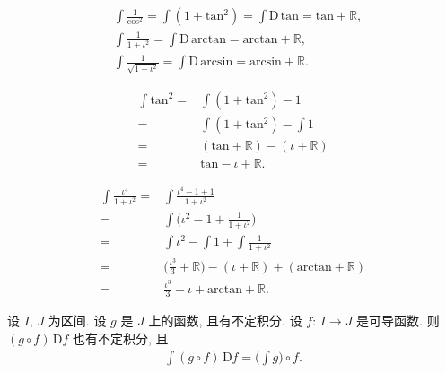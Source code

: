 \begin{example}
    \begin{align*}
         & \int {\frac{1}{\mathrm{cos}^2}} = \int {(1 + \mathrm{tan}^2)} = \int {\mathrm{D}\,\mathrm{tan}} = \mathrm{tan} + \mathbb{R}, \\
         & \int {\frac{1}{1 + \iota^2}} = \int {\mathrm{D}\,\mathrm{arctan}} = \mathrm{arctan} + \mathbb{R},                            \\
         & \int {\frac{1}{\sqrt{1 - \iota^2}}} = \int {\mathrm{D}\,\mathrm{arcsin}} = \mathrm{arcsin} + \mathbb{R}.
    \end{align*}
\end{example}

\begin{example}
    \begin{align*}
        \int {\mathrm{tan}^2}
        = {} & \int {(1 + \mathrm{tan}^2) - 1}                    \\
        = {} & \int {(1 + \mathrm{tan}^2)} - \int {1}             \\
        = {} & (\mathrm{tan} + \mathbb{R}) - (\iota + \mathbb{R}) \\
        = {} & \mathrm{tan} - \iota + \mathbb{R}.
    \end{align*}
\end{example}

\begin{example}
    \begin{align*}
        \int {\frac{\iota^4}{1 + \iota^2}}
        = {} & \int {\frac{\iota^4 - 1 + 1}{1 + \iota^2}}                                                           \\
        = {} & \int {\Bigg( \iota^2 - 1 + \frac{1}{1 + \iota^2} \Bigg)}                                             \\
        = {} & \int {\iota^2} - \int {1} + \int {\frac{1}{1 + \iota^2}}                                             \\
        = {} & \Bigg( \frac{\iota^3}{3} + \mathbb{R} \Bigg) - (\iota + \mathbb{R}) + (\mathrm{arctan} + \mathbb{R}) \\
        = {} & \frac{\iota^3}{3} - \iota + \mathrm{arctan} + \mathbb{R}.
    \end{align*}
\end{example}

\begin{theorem}
    设 $I$, $J$ 为区间. 设 $g$ 是 $J$ 上的函数, 且有不定积分. 设 $f$: $I \to J$ 是可导函数. 则 $(g \circ f)\, \mathrm{D}f$ 也有不定积分, 且
    \begin{align*}
        \int {(g \circ f)\, \mathrm{D}f} = \Bigg( \int {g} \Bigg) \circ f.
    \end{align*}
\end{theorem}

